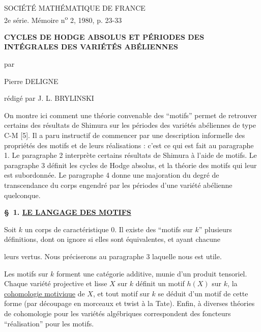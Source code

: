 \documentclass[10pt,a4paper]{article}
\begin{document}
\fontsize{8.65}{10.15}\selectfont
\sloppy

\begin{flushleft}\textsc{SOCIÉTÉ MATHÉMATIQUE DE FRANCE}\\
2e série. Mémoire n\textsuperscript{o} 2, 1980, p. 23-33
\end{flushleft}

\vspace{1.5em}
\begin{center}
{\bfseries CYCLES DE HODGE ABSOLUS ET PÉRIODES DES\\[0.35em]
INTÉGRALES DES VARIÉTÉS ABÉLIENNES}

\vspace{1.4em}
par

\vspace{1em}
Pierre DELIGNE

\vspace{0.5em}
rédigé par J. L. BRYLINSKI
\end{center}

\vspace{1em}
On montre ici comment une théorie convenable des ``motifs'' permet de retrouver certains des résultats de Shimura sur les périodes des variétés abéliennes de type C-M [5]. Il a paru instructif de commencer par une description informelle des propriétés des motifs et de leurs réalisations : c'est ce qui est fait au paragraphe 1. Le paragraphe 2 interprète certains résultats de Shimura à l'aide de motifs. Le paragraphe 3 définit les cycles de Hodge absolus, et la théorie des motifs qui leur est subordonnée. Le paragraphe 4 donne une majoration du degré de transcendance du corps engendré par les périodes d'une variété abélienne quelconque.

\vspace{0.8em}
\noindent\textbf{\S\ 1. \quad \uline{LE LANGAGE DES MOTIFS}}

Soit $k$ un corps de caractéristique $0$. Il existe des ``motifs sur $k$'' plusieurs définitions, dont on ignore si elles sont équivalentes, et ayant chacune


\newpage


leurs vertus. Nous préciserons au paragraphe 3 laquelle nous est utile.

Les motifs sur $k$ forment une catégorie additive, munie d'un produit tensoriel. Chaque variété projective et lisse $X$ sur $k$ définit un motif $h(X)$ sur $k$, la \uline{cohomologie motivique} de $X$, et tout motif sur $k$ se déduit d'un motif de cette forme (par découpage en morceaux et twist à la Tate). Enfin, à diverses théories de cohomologie pour les variétés algébriques correspondent des foncteurs ``réalisation'' pour les motifs.
\end{document}
